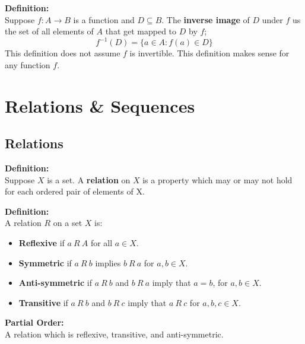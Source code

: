 \documentclass{report}
\newenvironment{frameblue}[1][BlueViolet]
  {\begin{tcolorbox}[colframe=#1,colback=white]}
  {\end{tcolorbox}}
\begin{document}
\begin{frameblue}
    \textbf{Definition:}\\
    Suppose $f : A \rightarrow B$ is a function and $D \subseteq B$. The \textbf{inverse image} of $D$ under $f$ us the set of all elements of $A$ that get mapped to $D$ by $f$;
    \begin{equation*}
        f^{-1}(D) = \{a \in A : f(a) \in D\}
    \end{equation*}
    This definition does not assume $f$ is invertible. This definition makes sense for any function $f$.
\end{frameblue}
\chapter{Relations \& Sequences}
\section{Relations}

\begin{frameblue}
    \textbf{Definition:}\\
    Suppose $X$ is a set. A \textbf{relation} on $X$ is a property which may or may not hold for each ordered pair of elements of X.
\end{frameblue}

\begin{frameblue}
    \textbf{Definition:}\\
    A relation $R$ on a set $X$ is:
    \begin{itemize}
        \item \textbf{Reflexive} if $a \: R \: A$ for all $a \in X$.
        \item \textbf{Symmetric} if $a \: R \: b$ implies $b \: R \: a$ for $a,b \in X$.
        \item \textbf{Anti-symmetric} if $a \: R \: b$ and $b \: R \: a$ imply that $a = b$, for $a, b \in X$.
        \item \textbf{Transitive} if $a \: R \: b$ and $b \: R \: c$ imply that $a \: R \: c$ for $a,b,c \in X$.
    \end{itemize}
\end{frameblue}

\textbf{Partial Order:}\\
A relation which is reflexive, transitive, and anti-symmetric.\\
\end{document}

